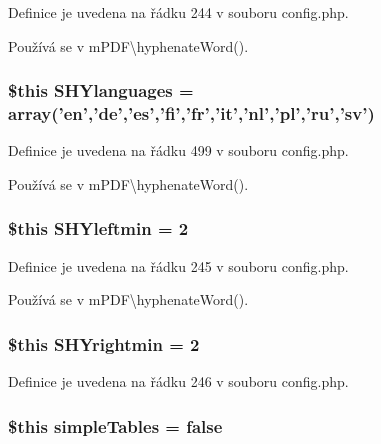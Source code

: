 Definice je uvedena na řádku 244 v souboru config.\-php.



Používá se v m\-P\-D\-F\textbackslash{}hyphenate\-Word().

\hypertarget{config_8php_a16472c453c561d44bf20f26567699a34}{
\subsubsection[{S\-H\-Ylanguages}]{\setlength{\rightskip}{0pt plus 5cm}\$this S\-H\-Ylanguages = array('en','de','es','fi','fr','it','nl','pl','ru','sv')}}\label{config_8php_a16472c453c561d44bf20f26567699a34}


Definice je uvedena na řádku 499 v souboru config.\-php.



Používá se v m\-P\-D\-F\textbackslash{}hyphenate\-Word().

\hypertarget{config_8php_aec90f2a0f4bcff8d49295731fc0c5214}{
\subsubsection[{S\-H\-Yleftmin}]{\setlength{\rightskip}{0pt plus 5cm}\$this S\-H\-Yleftmin = 2}}\label{config_8php_aec90f2a0f4bcff8d49295731fc0c5214}


Definice je uvedena na řádku 245 v souboru config.\-php.



Používá se v m\-P\-D\-F\textbackslash{}hyphenate\-Word().

\hypertarget{config_8php_a172dce8fad0eeaca6e6eb0e1d3c7940e}{
\subsubsection[{S\-H\-Yrightmin}]{\setlength{\rightskip}{0pt plus 5cm}\$this S\-H\-Yrightmin = 2}}\label{config_8php_a172dce8fad0eeaca6e6eb0e1d3c7940e}


Definice je uvedena na řádku 246 v souboru config.\-php.

\hypertarget{config_8php_a58afad1e5917c6e1efa081a242319daf}{
\subsubsection[{simple\-Tables}]{\setlength{\rightskip}{0pt plus 5cm}\$this simple\-Tables = {\bf false}}}\label{config_8php_a58afad1e5917c6e1efa081a242319daf}


